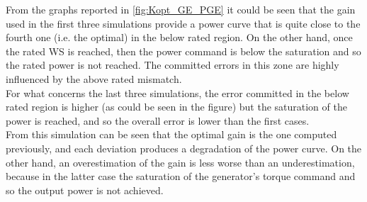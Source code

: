 From the graphs reported in \autoref{fig:Kopt_GE_PGE} it could be seen that the gain used in the first three simulations provide a power curve that is quite close to the fourth one (i.e. the optimal) in the below rated region. On the other hand, once the rated WS is reached, then the power command is below the saturation and so the rated power is not reached. The committed errors in this zone are highly influenced by the above rated mismatch. \\
For what concerns the last three simulations, the error committed in the below rated region is higher (as could be seen in the figure) but the saturation of the power is reached, and so the overall error is lower than the first cases. \\
From this simulation can be seen that the optimal gain is the one computed previously, and each deviation produces a degradation of the power curve. On the other hand, an overestimation of the gain is less worse than an underestimation, because in the latter case the saturation of the generator's torque command and so the output power is not achieved.

\newpage